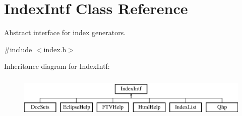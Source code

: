 \hypertarget{class_index_intf}{}\section{Index\+Intf Class Reference}
\label{class_index_intf}


Abstract interface for index generators.  




{\ttfamily \#include $<$index.\+h$>$}

Inheritance diagram for Index\+Intf\+:\begin{figure}[H]
\begin{center}
\leavevmode
\includegraphics[height=2.000000cm]{class_index_intf}
\end{center}
\end{figure}
